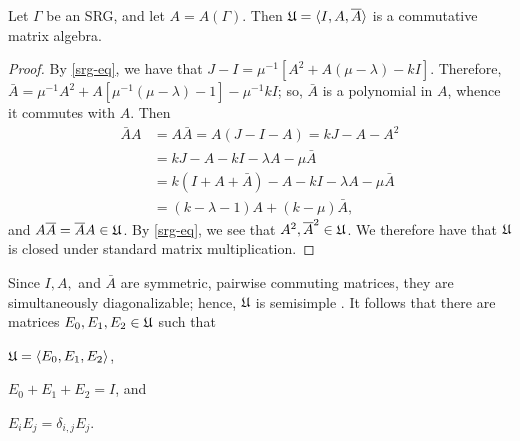 \documentclass[../../../main]{subfiles}
\begin{document}
\begin{prop}
 Let $\Gamma$ be an SRG, and let $A=A(\Gamma)$. Then $\mathfrak{U} = \langle I,A,\overline{A}\rangle$ is a commutative matrix algebra.
\end{prop}

\begin{proof}
 By \ref{srg-eq}, we have that $J-I=\mu^{-1}[A^2+A(\mu-\lambda)-kI]$. Therefore, $\bar A = \mu^{-1}A^2 + A[\mu^{-1}(\mu-\lambda)-1]-\mu^{-1}kI$; so, $\bar A$ is a polynomial in $A$, whence it commutes with $A$. Then 
 \begin{align*}
  \bar A A &= A \bar A = A(J-I-A) = kJ-A-A^2 \\
  &=kJ-A-kI-\lambda A-\mu\bar A \\
  &=k(I+A+\bar A)-A-kI-\lambda A-\mu\bar A \\
  &=(k-\lambda-1)A + (k-\mu)\bar A,
 \end{align*}
 and $A \overline{A} = \overline{A} A \in \mathfrak{U}$. By \ref{srg-eq}, we see that $A^2,\overline{A}^2 \in \mathfrak{U}$. We therefore have that $\mathfrak{U}$ is closed under standard matrix multiplication.
\end{proof}

Since $I,A,$ and $\bar A$ are symmetric, pairwise commuting matrices, they are simultaneously diagonalizable; hence, $\mathfrak{U}$ is semisimple \cite[see][]{lang-algebra}. It follows that there are matrices $E_0,E_1,E_2 \in \mathfrak{U}$ such that
\begin{enumerate*}[(a)]
 \item $\mathfrak{U} = \langle E_0,E_1,E_2\rangle$, 
 \item $E_0+E_1+E_2=I$, and
 \item $E_iE_j=\delta_{i,j}E_j$.
\end{enumerate*}
 
 \biblio
 
\end{document}
